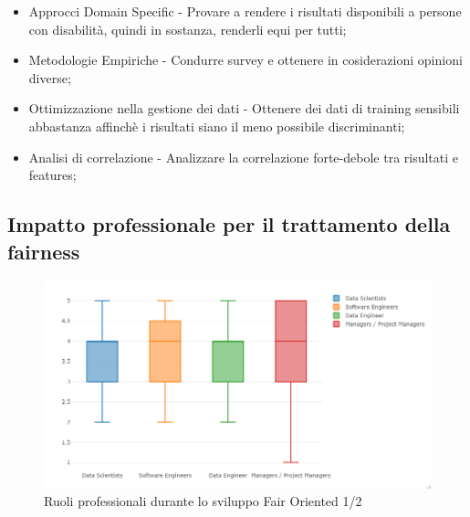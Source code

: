 	\begin{itemize}
	    \item Approcci Domain Specific - Provare a rendere i risultati disponibili a persone con disabilità, quindi in sostanza, renderli equi per tutti; 
	    \item Metodologie Empiriche - Condurre survey e ottenere in cosiderazioni opinioni diverse;
	    \item Ottimizzazione nella gestione dei dati - Ottenere dei dati di training sensibili abbastanza affinchè i risultati siano il meno possibile discriminanti;
	    \item Analisi di correlazione - Analizzare la correlazione forte-debole tra risultati e features;
	\end{itemize}
    
    \subsection{Impatto professionale per il trattamento della fairness}
	\begin{center}
		\hspace*{-5mm}%
	\end{center}
	
	  \begin{figure}[h!]
        \centering
        \includegraphics[width=1\textwidth]{figure/Analisi/RQ2/RoleImpactBoxPlot1.png}
        \caption{Ruoli professionali durante lo sviluppo Fair Oriented 1/2}
    \end{figure}
    
